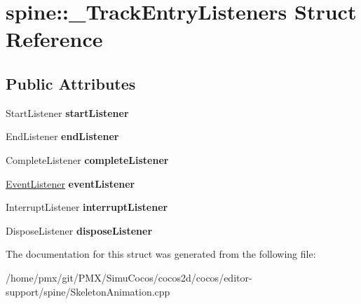 \hypertarget{structspine_1_1__TrackEntryListeners}{}\section{spine\+:\+:\+\_\+\+Track\+Entry\+Listeners Struct Reference}
\label{structspine_1_1__TrackEntryListeners}
\subsection*{Public Attributes}
\begin{DoxyCompactItemize}
\item 
\mbox{\label{structspine_1_1__TrackEntryListeners_ab2aee0d8701c5da3df872667a726f0f3}} 
Start\+Listener {\bfseries start\+Listener}
\item 
\mbox{\label{structspine_1_1__TrackEntryListeners_a14ea9cc93604f5f78b0226d83344abe4}} 
End\+Listener {\bfseries end\+Listener}
\item 
\mbox{\label{structspine_1_1__TrackEntryListeners_a57c9483637d62cc3a96319b89b282da6}} 
Complete\+Listener {\bfseries complete\+Listener}
\item 
\mbox{\label{structspine_1_1__TrackEntryListeners_ae088d4942e652c00ab524cbb3c6bfb4e}} 
\hyperlink{classEventListener}{Event\+Listener} {\bfseries event\+Listener}
\item 
\mbox{\label{structspine_1_1__TrackEntryListeners_af67244279ccc84213898bbba6d3ae606}} 
Interrupt\+Listener {\bfseries interrupt\+Listener}
\item 
\mbox{\label{structspine_1_1__TrackEntryListeners_a5b52430e4571019d538e4ac730b4be3c}} 
Dispose\+Listener {\bfseries dispose\+Listener}
\end{DoxyCompactItemize}


The documentation for this struct was generated from the following file\+:\begin{DoxyCompactItemize}
\item 
/home/pmx/git/\+P\+M\+X/\+Simu\+Cocos/cocos2d/cocos/editor-\/support/spine/Skeleton\+Animation.\+cpp\end{DoxyCompactItemize}
